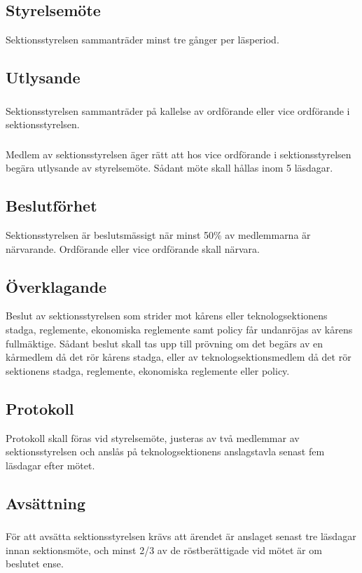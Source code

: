 \documentclass[a4paper, 10pt]{article}
\begin{document}
\subsection{Styrelsemöte}
Sektionsstyrelsen sammanträder minst tre gånger per läsperiod.
\subsection{Utlysande}
\subsubsection{}
Sektionsstyrelsen sammanträder på kallelse av ordförande eller vice ordförande i sektionsstyrelsen.
\subsubsection{}
Medlem av sektionsstyrelsen äger rätt att hos vice ordförande i sektionsstyrelsen begära utlysande av styrelsemöte. Sådant möte skall hållas inom 5 läsdagar.
\subsection{Beslutförhet}
Sektionsstyrelsen är beslutsmässigt när minst 50\% av medlemmarna är närvarande. Ordförande eller vice ordförande skall närvara.
\subsection{Överklagande}
Beslut av sektionsstyrelsen som strider mot kårens eller teknologsektionens stadga, reglemente, ekonomiska reglemente samt policy får undanröjas av kårens fullmäktige. Sådant beslut skall tas upp till prövning om det begärs av en kårmedlem då det rör kårens stadga, eller av teknologsektionsmedlem då det rör sektionens stadga, reglemente, ekonomiska reglemente eller policy.
\subsection{Protokoll}
Protokoll skall föras vid styrelsemöte, justeras av två medlemmar av sektionsstyrelsen och anslås på teknologsektionens anslagstavla senast fem läsdagar efter mötet.
\subsection{Avsättning}
\subsubsection{}
För att avsätta sektionsstyrelsen krävs att ärendet är anslaget senast tre läsdagar innan sektionsmöte, och minst 2/3 av de röstberättigade vid mötet är om beslutet ense.
\end{document}
